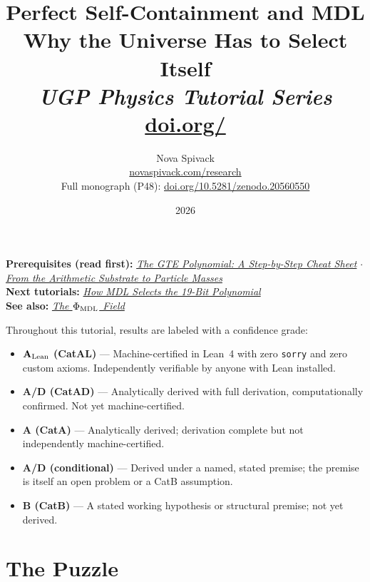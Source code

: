 \documentclass[11pt,a4paper]{article}
\title{\textbf{Perfect Self-Containment and MDL}\\[6pt]
\large Why the Universe Has to Select Itself\\[4pt]\normalsize\textit{UGP Physics Tutorial Series}
\\[2pt]\small\href{https://doi.org/\TutorialDOI}{doi.org/\TutorialDOI}}
\author{Nova Spivack\\[4pt]
\normalsize
\href{https://novaspivack.com/research}{novaspivack.com/research}\\[2pt]
\small Full monograph (P48):
\href{https://doi.org/10.5281/zenodo.20560550}{doi.org/10.5281/zenodo.20560550}
}
\date{2026}
\begin{document}
\setcounter{tocdepth}{2}
\maketitle
\tableofcontents
\newpage

\begin{tcolorbox}[colback=blue!6,colframe=blue!40!black,
  title=\textbf{UGP Physics Tutorial Series}]
\textbf{Prerequisites (read first):} \href{https://doi.org/10.5281/zenodo.20657889}{\emph{The GTE Polynomial: A Step-by-Step Cheat Sheet}} $\cdot$ \href{https://doi.org/10.5281/zenodo.20657913}{\emph{From the Arithmetic Substrate to Particle Masses}}\\[4pt]
\textbf{Next tutorials:} \href{https://doi.org/10.5281/zenodo.20657876}{\emph{How MDL Selects the 19-Bit Polynomial}}\\[4pt]
\textbf{See also:} \href{https://doi.org/10.5281/zenodo.20657885}{\emph{The $\Phi_{\rm MDL}$ Field}}
\end{tcolorbox}

\begin{tcolorbox}[colback=boxgreen,colframe=green!50!black,
  title=\textbf{Claim-Strength Taxonomy}]
Throughout this tutorial, results are labeled with a confidence grade:
\begin{itemize}[itemsep=2pt]
  \item \textbf{$\mathbf{A}_{\rm Lean}$ (CatAL)} --- Machine-certified in Lean~4 with zero \texttt{sorry} and zero custom axioms.  Independently verifiable by anyone with Lean installed.
  \item \textbf{A/D (CatAD)} --- Analytically derived with full derivation, computationally confirmed.  Not yet machine-certified.
  \item \textbf{A (CatA)} --- Analytically derived; derivation complete but not independently machine-certified.
  \item \textbf{A/D (conditional)} --- Derived under a named, stated premise; the premise is itself an open problem or a CatB assumption.
  \item \textbf{B (CatB)} --- A stated working hypothesis or structural premise; not yet derived.
\end{itemize}
\end{tcolorbox}


\section{The Puzzle}
\label{sec:puzzle}
\end{document}

